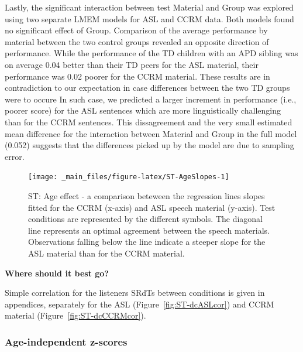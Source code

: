 \documentclass[a4paper, twoside]{templates/ociamthesis}
\begin{document}
Lastly, the significant interaction between test Material and Group was explored using two separate LMEM models for ASL and CCRM data. Both models found no significant effect of Group. Comparison of the average performance by material between the two control groups revealed an opposite direction of performance. While the performance of the TD children with an APD sibling was on average 0.04 better than their TD peers for the ASL material, their performance was 0.02 poorer for the CCRM material. These results are in contradiction to our expectation in case differences between the two TD groups were to occure In such case, we predicted a larger increment in performance (i.e., poorer score) for the ASL sentences which are more linguistically challenging than for the CCRM sentences. This dissagreement and the very small estimated mean difference for the interaction between Material and Group in the full model (0.052) suggests that the differences picked up by the model are due to sampling error.\\

\begin{figure}

{\centering \texttt{[image: \_main\_files/figure-latex/ST-AgeSlopes-1]} 

}

\caption{ST: Age effect - a comparison beteween the regression lines slopes fitted for the CCRM (x-axis) and ASL speech material (y-axis). Test conditions are represented by the different symbols. The diagonal line represents an optimal agreement between the speech materials. Observations falling below the line indicate a steeper slope for the ASL material than for the CCRM material.}\label{fig:ST-AgeSlopes}
\end{figure}

\begin{correction}
\textbf{Where should it best go?}

Simple correlation for the listeners SRdTs between conditions is given
in appendices, separately for the ASL (Figure~\ref{fig:ST-dcASLcor}) and
CCRM material (Figure~\ref{fig:ST-dcCCRMcor}).
\end{correction}

\hypertarget{age-independent-z-scores}{%
\subsubsection*{Age-independent z-scores}\label{age-independent-z-scores}}
\end{document}
